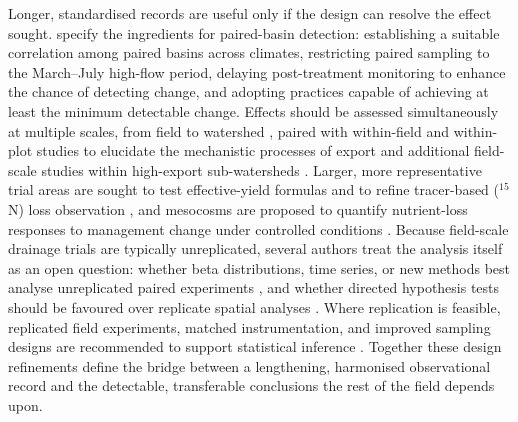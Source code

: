 \documentclass[11pt]{article}
\begin{document}
Longer, standardised records are useful only if the design can resolve the
effect sought. \textcite{Schilling2013} specify the ingredients for
paired-basin detection: establishing a suitable correlation among paired
basins across climates, restricting paired sampling to the March--July
high-flow period, delaying post-treatment monitoring to enhance the chance
of detecting change, and adopting practices capable of achieving at least
the minimum detectable change. Effects should be assessed simultaneously at
multiple scales, from field to watershed \parencite{Sunohara2016}, paired
with within-field and within-plot studies to elucidate the mechanistic
processes of export and additional field-scale studies within high-export
sub-watersheds \parencite{Irvine2019}. Larger, more representative trial
areas are sought to test effective-yield formulas \parencite{Xin2016c} and
to refine tracer-based ($^{15}$N) loss observation \parencite{Xiong2025},
and mesocosms are proposed to quantify nutrient-loss responses to
management change under controlled conditions \parencite{Loper2024}.
Because field-scale drainage trials are typically unreplicated, several
authors treat the analysis itself as an open question: whether beta
distributions, time series, or new methods best analyse unreplicated paired
experiments \parencite{Pagliari2021}, and whether directed hypothesis tests
should be favoured over replicate spatial analyses \parencite{Andrus2014}.
Where replication is feasible, replicated field experiments, matched
instrumentation, and improved sampling designs are recommended to support
statistical inference
\parencite{Okuda2020,Wamono2016b,Davis2019,Jacquemin2020}. Together these
design refinements define the bridge between a lengthening, harmonised
observational record and the detectable, transferable conclusions the rest
of the field depends upon.

\printbibliography
\end{document}
